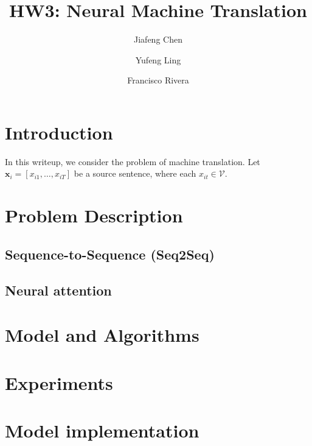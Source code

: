 \documentclass[12pt]{article}
\title{HW3: Neural Machine Translation}
\author{Jiafeng Chen \and Yufeng Ling \and
Francisco Rivera}
\newcommand{\sts}{Seq2Seq}
\begin{document}
\maketitle
\section{Introduction}
In this writeup, we consider the problem of machine translation. Let $\bm x_i = [x_{i1},\ldots,x_{iT}]$ be a source sentence, where each $x_{it} \in \mathcal V$.  

\section{Problem Description}
\subsection{Sequence-to-Sequence (\sts)}
\subsection{Neural attention}

\section{Model and Algorithms}

\section{Experiments}





\appendix
\section{Model implementation}

% 
% 
% 
% 
% 
\end{document}
